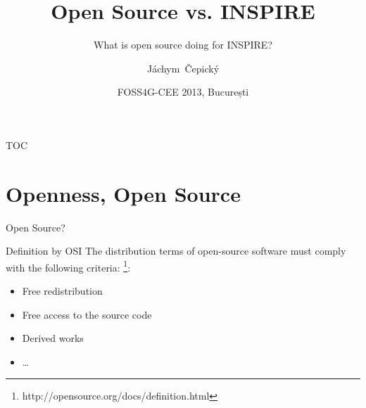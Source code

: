 \documentclass[xcolor=dvipsnames]{beamer}
\title[Open Source] %
{Open Source vs. INSPIRE}
\subtitle {What is open source doing for INSPIRE?}
\author[J. Čepický] %
{Jáchym~Čepický\inst{1}}
\institute %
{
  \inst{1}%
  Help Service - Remote Sensing s.r.o. \\
  Benešov\\
  \url{http://hsrs.cz}\\
  \
}
\date[] %
{FOSS4G-CEE 2013, București}
\begin{document}
\begin{frame}
  \titlepage
\end{frame}

\begin{frame}{TOC}
  \tableofcontents
\end{frame}





\section{Openness, Open Source}

\begin{frame}{Open Source?}

\begin{block}{Definition by OSI}
    The distribution terms of open-source software must comply with the following criteria: \footnote{http://opensource.org/docs/definition.html}:
    \begin{itemize} 
        \item Free redistribution 
        \item Free access to the source code
        \item Derived works
        \item \dots
    \end{itemize}
\end{block}
\end{frame}
\end{document}

